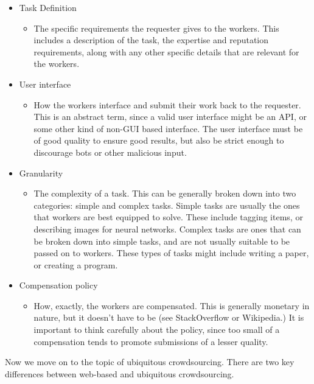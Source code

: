\documentclass{sig-alternate-05-2015}
\begin{document}
	\begin{itemize}
		\item Task Definition
		\begin{itemize}
			\item The specific requirements the requester gives to the workers. This includes a description of the task, the expertise and reputation requirements, along with any other specific details that are relevant for the workers.
		\end{itemize}
		\item User interface
		\begin{itemize}
			\item How the workers interface and submit their work back to the requester. This is an abstract term, since a valid user interface might be an API, or some other kind of non-GUI based interface. The user interface must be of good quality to ensure good results, but also be strict enough to discourage bots or other malicious input.
		\end{itemize}
		\item Granularity
		\begin{itemize}
			\item The complexity of a task. This can be generally broken down into two categories: simple and complex tasks. Simple tasks are usually the ones that workers are best equipped to solve. These include tagging items, or describing images for neural networks. Complex tasks are ones that can be broken down into simple tasks, and are not usually suitable to be passed on to workers. These types of tasks might include writing a paper, or creating a program.
		\end{itemize}
		\item Compensation policy
		\begin{itemize}
			\item How, exactly, the workers are compensated. This is generally monetary in nature, but it doesn't have to be (see StackOverflow or Wikipedia.) It is important to think carefully about the policy, since too small of a compensation tends to promote submissions of a lesser quality.
		\end{itemize}
	\end{itemize}
	
	
	Now we move on to the topic of ubiquitous crowdsourcing. There are two key differences between web-based and ubiquitous crowdsourcing. 
	
\end{document}
